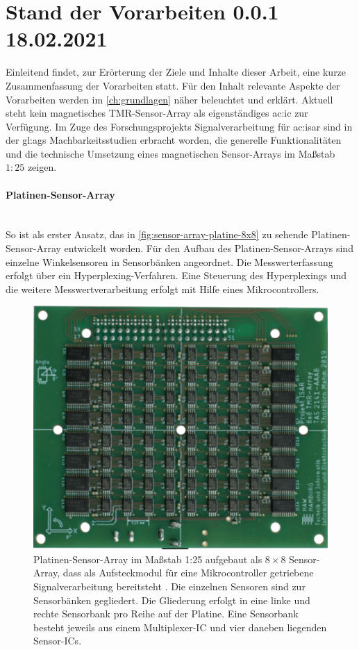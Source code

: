 %

\section{Stand der Vorarbeiten 0.0.1 18.02.2021}\label{sec:stand-der-vorarbeiten}

Einleitend findet, zur Erörterung der Ziele und Inhalte dieser Arbeit, eine kurze Zusammenfassung der Vorarbeiten statt.
Für den Inhalt relevante Aspekte der Vorarbeiten werden im \autoref{ch:grundlagen} näher beleuchtet und erklärt.
\newline
Aktuell steht kein magnetisches TMR-Sensor-Array als eigenständiges \gls{ac:ic} zur Verfügung. Im Zuge des Forschungsprojekts Signalverarbeitung für \gls{ac:isar} sind in der \gls{gl:ags} Machbarkeitsstudien \cite{Mehm2019}\cite{Ernsting2020} erbracht worden, die generelle Funktionalitäten und die technische Umsetzung eines magnetischen Sensor-Arrays im Maßstab $1:25$ zeigen.


\paragraph{Platinen-Sensor-Array}\label{par:platinen-sensor-array}$~$\\


So ist als erster Ansatz, das in \autoref{fig:sensor-array-platine-8x8} zu sehende Platinen-Sensor-Array entwickelt worden. Für den Aufbau des Platinen-Sensor-Arrays sind einzelne Winkelsensoren in Sensorbänken angeordnet. Die Messwerterfassung erfolgt über ein Hyperplexing-Verfahren.
Eine Steuerung des Hyperplexings und die weitere Messwertverarbeitung erfolgt mit Hilfe eines Mikrocontrollers.


\begin{figure}[tbph]
	\centering
	\includegraphics[width=0.5\linewidth]{chapters/images/Sensor-Array-Platine-8x8}
	\caption[Platinen-Sensor-Array Maßstab 1:25]{Platinen-Sensor-Array im Maßstab 1:25 aufgebaut als $8\times8$ Sensor-Array, dass als Aufsteckmodul für eine Mikrocontroller getriebene Signalverarbeitung bereitsteht \cite{Mehm2019}. Die einzelnen Sensoren sind zur Sensorbänken gegliedert. Die Gliederung erfolgt in eine linke und rechte Sensorbank pro Reihe auf der Platine. Eine Sensorbank besteht jeweils aus einem Multiplexer-IC und vier daneben liegenden Sensor-ICs.}
	\label{fig:sensor-array-platine-8x8}
\end{figure}


